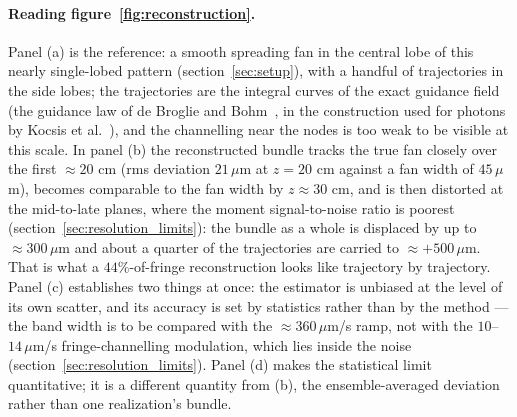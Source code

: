 \documentclass[11pt,a4paper]{article}
\begin{document}
\paragraph{Reading figure~\ref{fig:reconstruction}.} Panel (a) is the reference: a smooth spreading fan in the central lobe of this nearly single-lobed pattern (section~\ref{sec:setup}), with a handful of trajectories in the side lobes; the trajectories are the integral curves of the exact guidance field (the guidance law of de Broglie and Bohm~\cite{deBroglie1927, Bohm1952a, Holland1993}, in the construction used for photons by Kocsis et al.~\cite{Kocsis2011}), and the channelling near the nodes is too weak to be visible at this scale. In panel (b) the reconstructed bundle tracks the true fan closely over the first $\approx 20$ cm (rms deviation $21\,\mu$m at $z = 20$ cm against a fan width of $45\,\mu$m), becomes comparable to the fan width by $z \approx 30$ cm, and is then distorted at the mid-to-late planes, where the moment signal-to-noise ratio is poorest (section~\ref{sec:resolution_limits}): the bundle as a whole is displaced by up to $\approx 300\,\mu$m and about a quarter of the trajectories are carried to $\approx +500\,\mu$m. That is what a $44\%$-of-fringe reconstruction looks like trajectory by trajectory. Panel (c) establishes two things at once: the estimator is unbiased at the level of its own scatter, and its accuracy is set by statistics rather than by the method --- the band width is to be compared with the $\approx 360\,\mu$m/s ramp, not with the $10$--$14\,\mu$m/s fringe-channelling modulation, which lies inside the noise (section~\ref{sec:resolution_limits}). Panel (d) makes the statistical limit quantitative; it is a different quantity from (b), the ensemble-averaged deviation rather than one realization's bundle.
\end{document}
